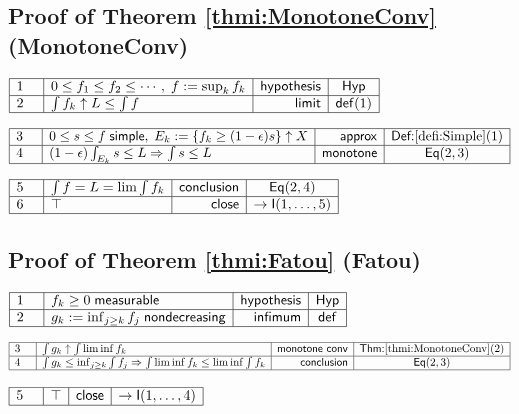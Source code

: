 \documentclass[11pt,reqno]{amsart}
\begin{document}
	\subsection*{Proof of Theorem \protect\ref{thmi:MonotoneConv} (\textsf{MonotoneConv})}
	\noindent$\begin{array}{|m{0.5cm}|l|r|c|}
	\hline
	1 & 0\le f_{1}\le f_{2}\le\cdots,\;f:=\sup_{k}f_{k} & \mathsf{hypothesis} & \mathsf{Hyp} \\ \hline
	2 & \int f_{k}\uparrow L\le\int f & \mathsf{limit} & \mathsf{def}(1) \\ \hline
	\end{array}$
	\par\nointerlineskip\noindent$\begin{array}{|m{0.5cm}|l|r|c|}
	\hline
	3 & 0\le s\le f\;\mathsf{simple},\;E_{k}:=\{f_{k}\ge(1-\epsilon)s\}\uparrow X & \mathsf{approx} & \textsf{Def:}\ref{defi:Simple}(1) \\ \hline
	4 & (1-\epsilon)\int_{E_{k}}s\le L\Rightarrow\int s\le L & \mathsf{monotone} & \mathsf{Eq}(2,3) \\ \hline
	\end{array}$
	\par\nointerlineskip\noindent$\begin{array}{|m{0.5cm}|l|r|c|}
	\hline
	5 & \int f=L=\lim\int f_{k} & \mathsf{conclusion} & \mathsf{Eq}(2,4) \\ \hline
	6 & \top & \mathsf{close} & \to\mathsf{I}(1,\dots,5) \\ \hline
	\end{array}$
	\medskip
	
	\subsection*{Proof of Theorem \protect\ref{thmi:Fatou} (\textsf{Fatou})}
	\noindent$\begin{array}{|m{0.5cm}|l|r|c|}
	\hline
	1 & f_{k}\ge0\;\mathsf{measurable} & \mathsf{hypothesis} & \mathsf{Hyp} \\ \hline
	2 & g_{k}:=\inf_{j\ge k}f_{j}\;\mathsf{nondecreasing} & \mathsf{infimum} & \mathsf{def} \\ \hline
	\end{array}$
	\par\nointerlineskip\noindent$\begin{array}{|m{0.5cm}|l|r|c|}
	\hline
	3 & \int g_{k}\uparrow\int\liminf f_{k} & \mathsf{monotone\ conv} & \textsf{Thm:}\ref{thmi:MonotoneConv}(2) \\ \hline
	4 & \int g_{k}\le\inf_{j\ge k}\int f_{j}\Rightarrow\int\liminf f_{k}\le\liminf\int f_{k} & \mathsf{conclusion} & \mathsf{Eq}(2,3) \\ \hline
	\end{array}$
	\par\nointerlineskip\noindent$\begin{array}{|m{0.5cm}|l|r|c|}
	\hline
	5 & \top & \mathsf{close} & \to\mathsf{I}(1,\dots,4) \\ \hline
	\end{array}$
	\medskip
	
\end{document}
